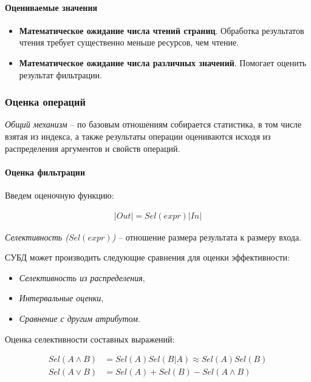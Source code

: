 \paragraph{Оцениваемые значения}

\begin{itemize}
	\item \textbf{Математическое ожидание числа чтений страниц}. Обработка результатов чтения
	      требует существенно меньше ресурсов, чем чтение.
	\item \textbf{Математическое ожидание числа различных значений}. Помогает оценить результат
	      фильтрации.
\end{itemize}

\subsubsection{Оценка операций}

\textit{Общий механизм} -- по базовым отношениям собирается статистика, в том числе взятая из
индекса, а также результаты операции оцениваются исходя из распределения аргументов и свойств
операций.

\paragraph{Оценка фильтрации}

Введем оценочную функцию:

\begin{align}
	|Out| = Sel(expr)|In|
\end{align}

\begin{definition}
	\textit{Селективность ($Sel(expr)$)} -- отношение размера результата к размеру входа.
\end{definition}

СУБД может производить следующие сравнения для оценки эффективности:

\begin{itemize}
	\item \textit{Селективность из распределения},
	\item \textit{Интервальные оценки},
	\item \textit{Сравнение с другим атрибутом}.
\end{itemize}

Оценка селективности составных выражений:

\begin{align}
	Sel(A \wedge B) & = Sel(A) Sel(B | A) \approx Sel(A) Sel(B) \\
	Sel(A \vee B)   & = Sel(A) + Sel(B) - Sel(A \wedge B)
\end{align}


